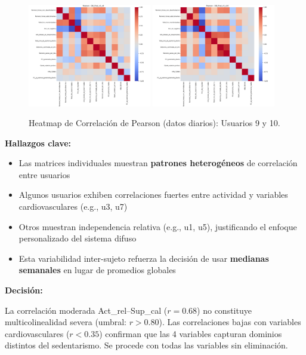 \documentclass[12pt,letterpaper,twoside]{report}
\begin{document}
\begin{calculobox}
\begin{figure}[htbp]
\centering
\includegraphics[width=0.48\textwidth]{figuras/DB_final_v3_u9_heatmap_pearson.png}
\includegraphics[width=0.48\textwidth]{figuras/DB_final_v3_u10_heatmap_pearson.png}
\caption{Heatmap de Correlación de Pearson (datos diarios): Usuarios 9 y 10.}
\label{fig:corr_heatmap_u9_u10}
\end{figure}

\textbf{Hallazgos clave:}
\begin{itemize}[noitemsep]
    \item Las matrices individuales muestran \textbf{patrones heterogéneos} de correlación entre usuarios
    \item Algunos usuarios exhiben correlaciones fuertes entre actividad y variables cardiovasculares (e.g., u3, u7)
    \item Otros muestran independencia relativa (e.g., u1, u5), justificando el enfoque personalizado del sistema difuso
    \item Esta variabilidad inter-sujeto refuerza la decisión de usar \textbf{medianas semanales} en lugar de promedios globales
\end{itemize}

\begin{decisionbox}
\textbf{Decisión:}

La correlación moderada Act\_rel--Sup\_cal ($r=0.68$) no constituye multicolinealidad severa (umbral: $r > 0.80$). Las correlaciones bajas con variables cardiovasculares ($r < 0.35$) confirman que las 4 variables capturan dominios distintos del sedentarismo. Se procede con todas las variables sin eliminación.
\end{decisionbox}


\end{calculobox}
\end{document}
